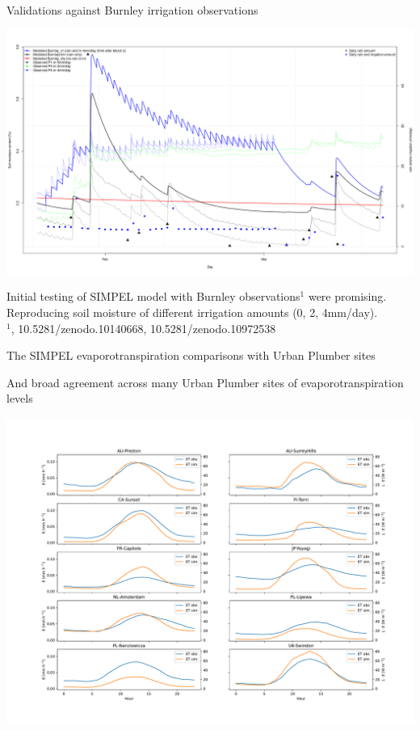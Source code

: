 \documentclass{beamer}
\begin{document}
\begin{frame}{Validations against Burnley irrigation observations} 
\begin{center}
\includegraphics[scale=0.18]{BurnleyComparisons.png}
\end{center}

Initial testing of SIMPEL model with Burnley observations$^{1}$ were promising. Reproducing soil moisture of different irrigation amounts (0, 2, 4mm/day).
\\
$^{1}${\tiny \cite{Cheung2024}, 10.5281/zenodo.10140668, 10.5281/zenodo.10972538}
\end{frame}



\begin{frame}{The SIMPEL evaporotranspiration comparisons with Urban Plumber sites} 

{\footnotesize And broad agreement across many Urban Plumber sites of evaporotranspiration levels}
\begin{center}
\includegraphics[scale=0.24]{et_presunangle.pdf}
\end{center}
\end{frame}
\end{document}
